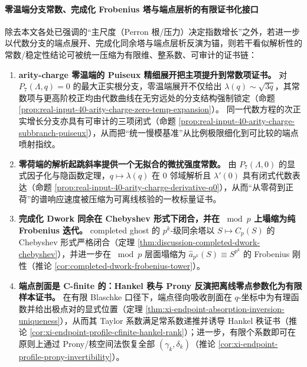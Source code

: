 \paragraph{零温端分支常数、完成化 Frobenius 塔与端点层析的有限证书化接口}
除去本文各处已强调的“主尺度（Perron 根/压力）决定指数增长”之外，若进一步以代数分支的端点展开、完成化同余塔与端点层析反演为锚，则若干看似解析性的常数/稳定性结论可被统一压缩为有限维、整系数、可审计的证书链：
\begin{enumerate}
  \item \textbf{arity-charge 零温端的 Puiseux 精细展开把主项提升到常数项证书。}
  对 \(P_7(\Lambda,q)=0\) 的最大正实根分支，零温端展开不仅给出 \(\lambda(q)\sim \sqrt{3q}\)，其常数项与更高阶校正均由代数曲线在无穷远处的分支结构强制锁定（命题 \ref{prop:real-input-40-arity-charge-zero-temp-expansion}）。
  同一代数方程的次正实增长分支亦具有可审计的三项闭式（命题 \ref{prop:real-input-40-arity-charge-subbranch-puiseux}），从而把“统一慢模基准”从比例极限细化到可比较的端点喷射指纹。

  \item \textbf{零荷端的解析起跳斜率提供一个无拟合的微扰强度常数。}
  由 \(P_7(\Lambda,0)\) 的显式因子化与隐函数定理，\(q\mapsto\lambda(q)\) 在 \(0\) 邻域解析且 \(\lambda'(0)\) 具有闭式代数表达（命题 \ref{prop:real-input-40-arity-charge-derivative-q0}），从而“从零荷到正荷”的谱响应速度被压缩为可离线核验的一枚标量证书。

  \item \textbf{完成化 Dwork 同余在 Chebyshev 形式下闭合，并在 \texorpdfstring{$\bmod p$}{mod p} 上塌缩为纯 Frobenius 迭代。}
  completed ghost 的 \(p^k\)-级同余塔以 \(S\mapsto C_p(S)\) 的 Chebyshev 形式严格闭合（定理 \ref{thm:discussion-completed-dwork-chebyshev}），并进一步在 \(\bmod p\) 层面塌缩为 \(\widehat a_{p^k}(S)\equiv S^{p^k}\) 的 Frobenius 刚性（推论 \ref{cor:completed-dwork-frobenius-tower}）。

  \item \textbf{端点剖面是 C-finite 的：Hankel 秩与 Prony 反演把离线零点参数化为有限样本证书。}
  在有限 Blaschke 口径下，端点径向吸收剖面在 \(q\)-坐标中为有理函数并给出极点对的显式位置（定理 \ref{thm:xi-endpoint-absorption-inversion-uniqueness}），从而其 Taylor 系数满足常系数递推并诱导 Hankel 秩证书（推论 \ref{cor:xi-endpoint-profile-cfinite-hankel-rank}）；进一步，有限个系数即可在原则上通过 Prony/核空间法恢复全部 \((\gamma_k,\delta_k)\)（推论 \ref{cor:xi-endpoint-profile-prony-invertibility}）。
\end{enumerate}

